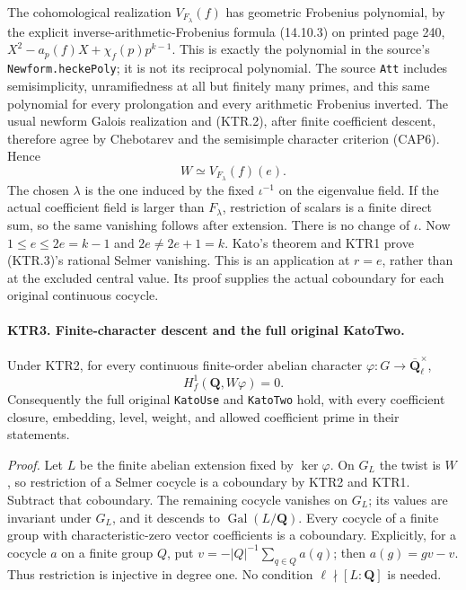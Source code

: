 The cohomological realization \(V_{F_\lambda}(f)\) has geometric
Frobenius polynomial, by the explicit inverse-arithmetic-Frobenius
formula (14.10.3) on printed page 240,
\(X^2-a_p(f)X+\chi_f(p)p^{k-1}\).
This is exactly the polynomial in the source's
\texttt{Newform.heckePoly}; it is not its reciprocal polynomial.
The source \texttt{Att} includes semisimplicity, unramifiedness
at all but finitely many primes, and this same polynomial for
every prolongation and every arithmetic Frobenius inverted.
The usual newform Galois realization and (KTR.2), after finite
coefficient descent, therefore agree by Chebotarev and the
semisimple character criterion (CAP6).  Hence
\[
          W\simeq V_{F_\lambda}(f)(e).
 \tag{KTR.3}
\]
The chosen \(\lambda\) is the one induced by the fixed
\(\iota^{-1}\) on the eigenvalue field.  If the actual
coefficient field is larger than \(F_\lambda\), restriction
of scalars is a finite direct sum, so the same vanishing follows
after extension.  There is no change of \(\iota\).
Now \(1\le e\le2e=k-1\) and \(2e\ne2e+1=k\).
Kato's theorem and KTR1 prove (KTR.3)'s rational Selmer vanishing.
This is an application at \(r=e\), rather than at the excluded
central value.  Its proof supplies the actual coboundary for
each original continuous cocycle.

\paragraph{KTR3. Finite-character descent and the full original KatoTwo.}
\label{claim:KTR3}
Under KTR2, for every continuous finite-order abelian character
\(\varphi:G\to\overline{\mathbf Q}_\ell^\times\),
\[
                       H^1_f(\mathbf Q,W\varphi)=0.
 \tag{KTR.4}
\]
Consequently the full original \texttt{KatoUse} and
\texttt{KatoTwo} hold, with every coefficient closure, embedding,
level, weight, and allowed coefficient prime in their statements.

\emph{Proof.}
Let \(L\) be the finite abelian extension fixed by
\(\ker\varphi\).  On \(G_L\) the twist is \(W\), so
restriction of a Selmer cocycle is a coboundary by KTR2 and
KTR1.  Subtract that coboundary.  The remaining cocycle vanishes
on \(G_L\); its values are invariant under \(G_L\), and it
descends to \(\operatorname{Gal}(L/\mathbf Q)\).
Every cocycle of a finite group with characteristic-zero vector
coefficients is a coboundary.  Explicitly, for a cocycle \(a\)
on a finite group \(Q\), put
\(v=-|Q|^{-1}\sum_{q\in Q}a(q)\); then
\(a(g)=g v-v\).  Thus restriction is injective in degree one.
No condition \(\ell\nmid[L:\mathbf Q]\) is needed.

